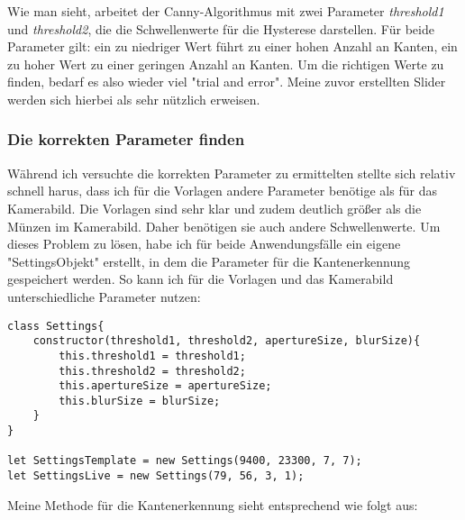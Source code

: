 Wie man sieht, arbeitet der Canny-Algorithmus mit zwei Parameter \textit{threshold1} und \textit{threshold2}, die die Schwellenwerte für die Hysterese darstellen. Für beide Parameter gilt: ein zu niedriger Wert führt zu einer hohen Anzahl an Kanten, ein zu hoher Wert zu einer geringen Anzahl an Kanten. Um die richtigen Werte zu finden, bedarf es also wieder viel "trial and error". Meine zuvor erstellten Slider werden sich hierbei als sehr nützlich erweisen.
\subsubsection{Die korrekten Parameter finden}
Während ich versuchte die korrekten Parameter zu ermittelten stellte sich relativ schnell harus, dass ich für die Vorlagen andere Parameter benötige als für das Kamerabild. Die Vorlagen sind sehr klar und zudem deutlich größer als die Münzen im Kamerabild. Daher benötigen sie auch andere Schwellenwerte. Um dieses Problem zu lösen, habe ich für beide Anwendungsfälle ein eigene "SettingsObjekt" erstellt, in dem die Parameter für die Kantenerkennung gespeichert werden. So kann ich für die Vorlagen und das Kamerabild unterschiedliche Parameter nutzen:

\begin{lstlisting}[style=JavaScript]
class Settings{
    constructor(threshold1, threshold2, apertureSize, blurSize){
        this.threshold1 = threshold1;
        this.threshold2 = threshold2;
        this.apertureSize = apertureSize;
        this.blurSize = blurSize;
    }
}

let SettingsTemplate = new Settings(9400, 23300, 7, 7);
let SettingsLive = new Settings(79, 56, 3, 1);
\end{lstlisting}

Meine Methode für die Kantenerkennung sieht entsprechend wie folgt aus:

